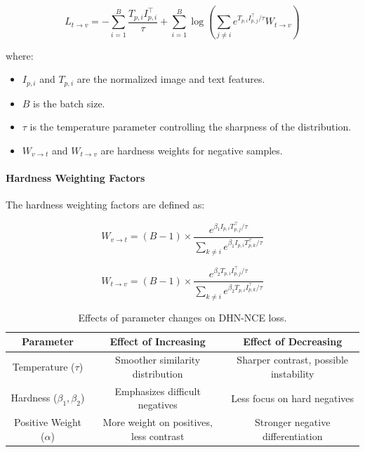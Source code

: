 \documentclass[./dissertation.tex]{subfiles}
\begin{document}
\begin{equation}
    L_{t \to v} = -\sum_{i=1}^{B} \frac{T_{p,i} I_{p,i}^\top}{\tau} + \sum_{i=1}^{B} \log \left( \sum_{j \neq i} e^{T_{p,i} I_{p,j}^\top / \tau} W_{t \to v} \right)
\end{equation}

where:
\begin{itemize}
    \item \( I_{p,i} \) and \( T_{p,i} \) are the normalized image and text features.
    \item \( B \) is the batch size.
    \item \( \tau \) is the temperature parameter controlling the sharpness of the distribution.
    \item \( W_{v \to t} \) and \( W_{t \to v} \) are hardness weights for negative samples.
\end{itemize}

\paragraph{Hardness Weighting Factors\\}

The hardness weighting factors are defined as:

\begin{equation}
    W_{v \to t} = (B-1) \times \frac{e^{\beta_1 I_{p,i} T_{p,j}^\top / \tau}}{\sum_{k \neq i} e^{\beta_1 I_{p,i} T_{p,k}^\top / \tau}}
\end{equation}

\begin{equation}
    W_{t \to v} = (B-1) \times \frac{e^{\beta_2 T_{p,i} I_{p,j}^\top / \tau}}{\sum_{k \neq i} e^{\beta_2 T_{p,i} I_{p,k}^\top / \tau}}
\end{equation}


\begin{table}
    \caption{Effects of parameter changes on DHN-NCE loss.}
    \centering
    \label{tbl:param_change_effect}
    \begin{tabular}{|c|c|c|}
        \hline
        \textbf{Parameter}                & \textbf{Effect of Increasing}           & \textbf{Effect of Decreasing}          \\
        \hline
        Temperature (\( \tau \))          & Smoother similarity distribution        & Sharper contrast, possible instability \\
        \hline
        Hardness (\( \beta_1, \beta_2 \)) & Emphasizes difficult negatives          & Less focus on hard negatives           \\
        \hline
        Positive Weight (\( \alpha \))    & More weight on positives, less contrast & Stronger negative differentiation      \\
        \hline
    \end{tabular}
\end{table}
\end{document}
